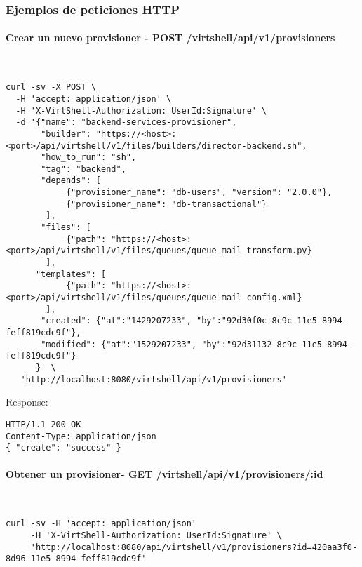 \subsubsection{Ejemplos de peticiones HTTP}

\paragraph{Crear un nuevo provisioner - POST /virtshell/api/v1/provisioners} ~\\


\begin{lstlisting}[style=json]
curl -sv -X POST \
  -H 'accept: application/json' \
  -H 'X-VirtShell-Authorization: UserId:Signature' \
  -d '{"name": "backend-services-provisioner",
       "builder": "https://<host>:<port>/api/virtshell/v1/files/builders/director-backend.sh",
       "how_to_run": "sh",
       "tag": "backend",
       "depends": [
            {"provisioner_name": "db-users", "version": "2.0.0"},
            {"provisioner_name": "db-transactional"}
        ],
       "files": [
            {"path": "https://<host>:<port>/api/virtshell/v1/files/queues/queue_mail_transform.py}
        ],
      "templates": [
            {"path": "https://<host>:<port>/api/virtshell/v1/files/queues/queue_mail_config.xml}
        ],        
       "created": {"at":"1429207233", "by":"92d30f0c-8c9c-11e5-8994-feff819cdc9f"},
       "modified": {"at":"1529207233", "by":"92d31132-8c9c-11e5-8994-feff819cdc9f"}
      }' \
   'http://localhost:8080/virtshell/api/v1/provisioners'
\end{lstlisting}

Response:

\begin{lstlisting}[style=json]
HTTP/1.1 200 OK
Content-Type: application/json
{ "create": "success" }
\end{lstlisting}

\paragraph{Obtener un provisioner- GET /virtshell/api/v1/provisioners/:id} ~\\

\begin{lstlisting}[style=json]
curl -sv -H 'accept: application/json' 
     -H 'X-VirtShell-Authorization: UserId:Signature' \ 
     'http://localhost:8080/api/virtshell/v1/provisioners?id=420aa3f0-8d96-11e5-8994-feff819cdc9f'
\end{lstlisting}

